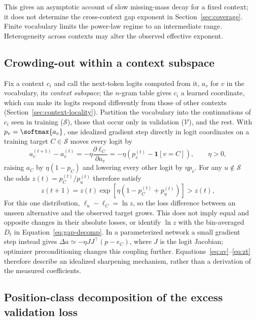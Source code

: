 This gives an asymptotic account of slow missing-mass decay for a fixed context; it does not determine the cross-context gap exponent in Section~\ref{sec:coverage}. Finite vocabulary limits the power-law regime to an intermediate range. Heterogeneity across contexts may alter the observed effective exponent.

\subsection{Crowding-out within a context subspace}
\label{app:crowding-derivation}

Fix a context $c_i$ and call the next-token logits computed from it, $a_v$ for $v$ in the vocabulary, its \emph{context subspace}; the $n$-gram table gives $c_i$ a learned coordinate, which can make its logits respond differently from those of other contexts (Section~\ref{sec:context-locality}). Partition the vocabulary into the continuations of $c_i$ seen in training ($\mathcal{S}$), those that occur only in validation ($\mathcal{V}$), and the rest. With $p_v=\softmax{a_v}$, one idealized gradient step directly in logit coordinates on a training target $C\in\mathcal{S}$ moves every logit by
\begin{equation}
a_v^{(t+1)}-a_v^{(t)}=-\eta\frac{\partial\ell_C}{\partial a_v}=-\eta\left(p_v^{(t)}-\mathbf{1}[v=C]\right),\qquad \eta>0,
\label{eq:av}
\end{equation}
raising $a_C$ by $\eta(1-p_C)$ and lowering every other logit by $\eta p_v$. For any $u\notin\mathcal{S}$ the odds $z(t)=p_C^{(t)}/p_u^{(t)}$ therefore satisfy
\begin{equation}
z(t+1)=z(t)\exp\!\left[\eta\left(1-p_C^{(t)}+p_u^{(t)}\right)\right]>z(t),
\label{eq:zt}
\end{equation}
For this one distribution, $\ell_u-\ell_C=\ln z$, so the loss difference between an unseen alternative and the observed target grows. This does not imply equal and opposite changes in their absolute losses, or identify $\ln z$ with the bin-averaged $D_t$ in Equation~\eqref{eq:gap-decomp}. In a parameterized network a small gradient step instead gives $\Delta a\simeq-\eta JJ^\top(p-e_C)$, where $J$ is the logit Jacobian; optimizer preconditioning changes this coupling further. Equations~\eqref{eq:av}--\eqref{eq:zt} therefore describe an idealized sharpening mechanism, rather than a derivation of the measured coefficients.

\subsection{Position-class decomposition of the excess validation loss}
\label{app:novel-share}


